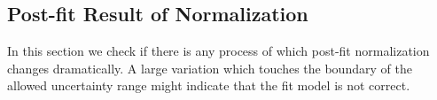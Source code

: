 %
%
%
%
\subsection{Post-fit Result of Normalization} 
\label{sec:postnorm}

In this section we check if there is any process of which post-fit 
normalization changes dramatically. A large variation which touches 
the boundary of the allowed uncertainty range might indicate that 
the fit model is not correct. 


